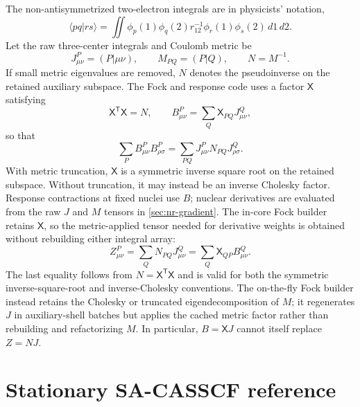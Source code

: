 \documentclass[aip,preprint,nofootinbib]{revtex4-1}
\begin{document}
The non-antisymmetrized two-electron integrals are in physicists' notation,
\begin{equation}
 \langle pq|rs\rangle
 =\iint\phi_p(1)\phi_q(2)r_{12}^{-1}\phi_r(1)\phi_s(2)
 \,d1\,d2.
 \label{eq:nr-physicists-eri}
\end{equation}
Let the raw three-center integrals and Coulomb metric be
\begin{equation}
 J^P_{\mu\nu}=(P|\mu\nu),
 \qquad M_{PQ}=(P|Q),
 \qquad N=M^{-1}.
 \label{eq:nr-raw-df}
\end{equation}
If small metric eigenvalues are removed, $N$ denotes the pseudoinverse on the
retained auxiliary subspace.  The Fock and response code uses a factor
$\mathsf X$ satisfying
\begin{equation}
 \mathsf X^{\mathsf T}\mathsf X=N,
 \qquad
 B^P_{\mu\nu}=\sum_Q\mathsf X_{PQ}J^Q_{\mu\nu},
 \label{eq:nr-orthonormal-df}
\end{equation}
so that
\begin{equation}
 \sum_P B^P_{\mu\nu}B^P_{\rho\sigma}
 =\sum_{PQ}J^P_{\mu\nu}N_{PQ}J^Q_{\rho\sigma}.
 \label{eq:nr-df-identity}
\end{equation}
With metric truncation, $\mathsf X$ is a symmetric inverse square root on the
retained subspace.  Without truncation, it may instead be an inverse Cholesky
factor.  Response contractions at fixed nuclei use $B$; nuclear derivatives
are evaluated from the raw $J$ and $M$ tensors in \cref{sec:nr-gradient}.
The in-core Fock builder retains $\mathsf X$, so the metric-applied tensor
needed for derivative weights is obtained without rebuilding either integral
array:
\begin{equation}
 Z^P_{\mu\nu}
 =\sum_QN_{PQ}J^Q_{\mu\nu}
 =\sum_Q\mathsf X_{QP}B^Q_{\mu\nu}.
 \label{eq:nr-fock-reused-metric-df}
\end{equation}
The last equality follows from
$N=\mathsf X^{\mathsf T}\mathsf X$ and is valid for both the symmetric
inverse-square-root and inverse-Cholesky conventions.  The on-the-fly Fock
builder instead retains the Cholesky or truncated eigendecomposition of $M$;
it regenerates $J$ in auxiliary-shell batches but applies the cached metric
factor rather than rebuilding and refactorizing $M$.  In particular,
$B=\mathsf XJ$ cannot itself replace $Z=NJ$.

\section{Stationary SA-CASSCF reference}
\end{document}
